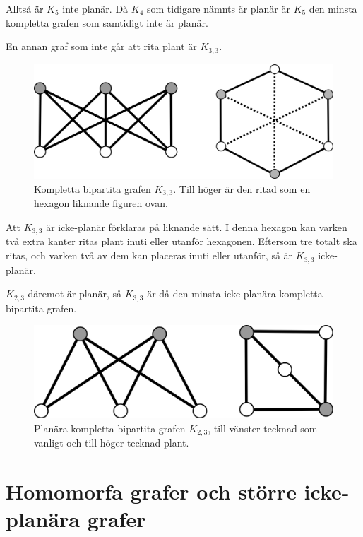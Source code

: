 \documentclass[a4paper,11pt]{article}
\begin{document}
Alltså är $K_5$ inte planär. Då $K_4$ som tidigare nämnts är planär är $K_5$ den minsta kompletta grafen som samtidigt inte är planär.

En annan graf som inte går att rita plant är $K_{3,3}$.

\begin{figure}[!ht]
	\begin{center}
		\includegraphics{fig6}
		\caption{Kompletta bipartita grafen $K_{3,3}$. Till höger är den ritad som en hexagon liknande figuren ovan.}
		\label{fig6}
	\end{center}
\end{figure}
\FloatBarrier

Att $K_{3,3}$ är icke-planär förklaras på liknande sätt. I denna hexagon kan varken två extra kanter ritas plant inuti eller utanför hexagonen. Eftersom tre totalt ska ritas, och varken två av dem kan placeras inuti eller utanför, så är $K_{3,3}$ icke-planär.

$K_{2,3}$ däremot är planär, så $K_{3,3}$ är då den minsta icke-planära kompletta bipartita grafen.

\begin{figure}[!ht]
	\begin{center}
		\includegraphics{fig7}
		\caption{Planära kompletta bipartita grafen $K_{2,3}$, till vänster tecknad som vanligt och till höger tecknad plant.}
		\label{fig7}
	\end{center}
\end{figure}
\FloatBarrier

\section*{Homomorfa grafer och större icke-planära grafer}
\end{document}
